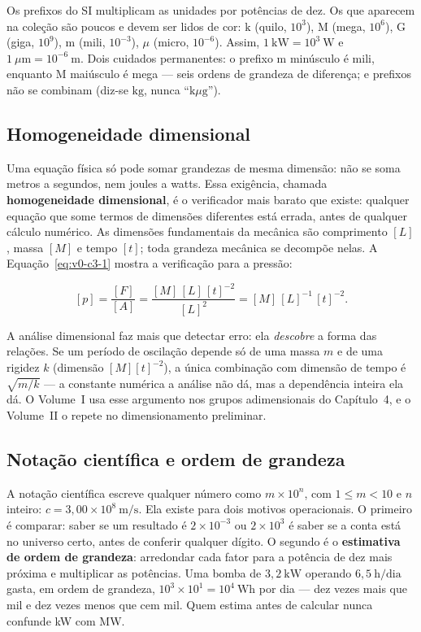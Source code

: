 \documentclass[12pt,a4paper]{article}
\numberwithin{equation}{section}
\numberwithin{table}{section}
\numberwithin{figure}{section}
\begin{document}
Os prefixos do SI multiplicam as unidades por potências de dez. Os que
aparecem na coleção são poucos e devem ser lidos de cor:
$\mathrm{k}$ (quilo, $10^3$), $\mathrm{M}$ (mega, $10^6$),
$\mathrm{G}$ (giga, $10^9$), $\mathrm{m}$ (mili, $10^{-3}$),
$\mu$ (micro, $10^{-6}$). Assim, $1\ \mathrm{kW} = 10^3\ \mathrm{W}$ e
$1\ \mu\mathrm{m} = 10^{-6}\ \mathrm{m}$. Dois cuidados permanentes: o
prefixo $\mathrm{m}$ minúsculo é mili, enquanto $\mathrm{M}$ maiúsculo é
mega --- seis ordens de grandeza de diferença; e prefixos não se combinam
(diz-se $\mathrm{kg}$, nunca ``$\mathrm{k}\mu\mathrm{g}$'').

\subsection{Homogeneidade dimensional}

Uma equação física só pode somar grandezas de mesma dimensão: não se soma
metros a segundos, nem joules a watts. Essa exigência, chamada
\textbf{homogeneidade dimensional}, é o verificador mais barato que existe:
qualquer equação que some termos de dimensões diferentes está errada, antes
de qualquer cálculo numérico. As dimensões fundamentais da mecânica são
comprimento $[L]$, massa $[M]$ e tempo $[t]$; toda grandeza mecânica se
decompõe nelas. A Equação~\eqref{eq:v0-c3-1} mostra a verificação para a
pressão:

\begin{equation}\label{eq:v0-c3-1}
[p] = \frac{[F]}{[A]} = \frac{[M]\,[L]\,[t]^{-2}}{[L]^2}
    = [M]\,[L]^{-1}\,[t]^{-2}.
\end{equation}

A análise dimensional faz mais que detectar erro: ela \emph{descobre} a forma
das relações. Se um período de oscilação depende só de uma massa $m$ e de
uma rigidez $k$ (dimensão $[M][t]^{-2}$), a única combinação com dimensão de
tempo é $\sqrt{m/k}$ --- a constante numérica a análise não dá, mas a
dependência inteira ela dá. O Volume~I usa esse argumento nos grupos
adimensionais do Capítulo~4, e o Volume~II o repete no dimensionamento
preliminar.

\subsection{Notação científica e ordem de grandeza}

A notação científica escreve qualquer número como
$m \times 10^n$, com $1 \le m < 10$ e $n$ inteiro:
$c = 3{,}00 \times 10^8\ \mathrm{m/s}$. Ela existe para dois motivos
operacionais. O primeiro é comparar: saber se um resultado é
$2 \times 10^{-3}$ ou $2 \times 10^{3}$ é saber se a conta está no
universo certo, antes de conferir qualquer dígito. O segundo é o
\textbf{estimativa de ordem de grandeza}: arredondar cada fator para a
potência de dez mais próxima e multiplicar as potências. Uma bomba de
$3{,}2\ \mathrm{kW}$ operando $6{,}5\ \mathrm{h/dia}$ gasta, em ordem de
grandeza, $10^3 \times 10^1 = 10^4\ \mathrm{Wh}$ por dia --- dez vezes mais
que mil e dez vezes menos que cem mil. Quem estima antes de calcular nunca
confunde kW com MW.
\end{document}

